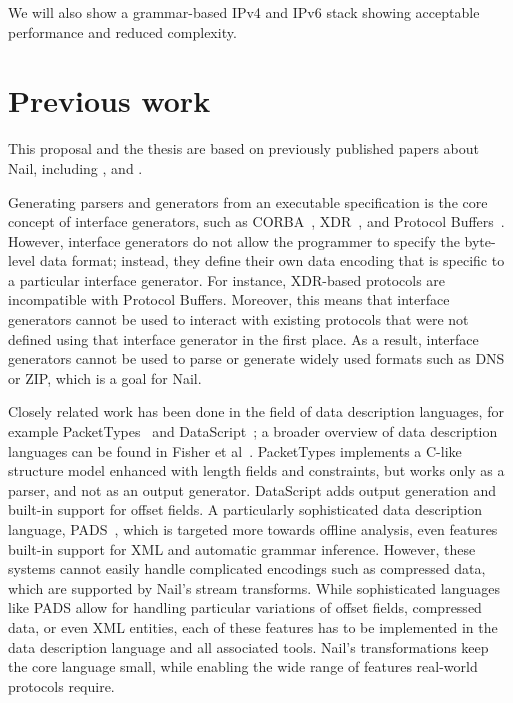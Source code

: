 \documentclass[a4paper]{article}
\begin{document}
We will also show a grammar-based IPv4 and IPv6  stack showing acceptable performance and reduced complexity.
\section{Previous work}

This proposal and the thesis are based on previously published papers about Nail, including \cite{bangert:nail-langsec}, \cite{bangert:nail-osdi14} and \cite{bangert:nail-login}.



Generating parsers and generators from an executable specification is the
core concept of interface generators, such as CORBA~\cite{omg:corba},
XDR~\cite{RFC:1832}, and Protocol Buffers~\cite{varda2008}.  However,
interface generators do not allow the programmer to specify the byte-level
data format; instead, they define their own data encoding that is
specific to a particular interface generator.  For instance, XDR-based
protocols are incompatible with Protocol Buffers.  Moreover, this means
that interface generators cannot be used to interact with existing protocols
that were not defined using that interface generator in the first place.
As a result, interface generators cannot be used to parse or generate
widely used formats such as DNS or ZIP, which is a goal for Nail.

Closely related work has been done in the field of data description languages, for example
PacketTypes~\cite{mccann2000packet} and DataScript~\cite{back2002datascript}; a
broader overview of data description languages can be found in Fisher et
al~\cite{Fisher:700DDL}.
PacketTypes implements a C-like structure model enhanced with
length fields and constraints, but works only as a parser, and
not as an output generator.
DataScript adds output generation and built-in support for offset fields.
A particularly sophisticated data description language, PADS~\cite{Fisher:2005:PDL:1064978.1065046},
which is targeted more towards offline analysis, even features built-in support for XML and
automatic grammar inference.
However, these systems cannot easily handle complicated encodings such as compressed data, which are
supported by Nail's stream transforms. While sophisticated languages like PADS allow for handling
particular variations of offset fields, compressed data, or even XML entities, each of these
features has to be implemented in the data description language and all associated tools. Nail's
transformations keep the core language small, while enabling the wide range of
features real-world protocols require. 
\end{document}
